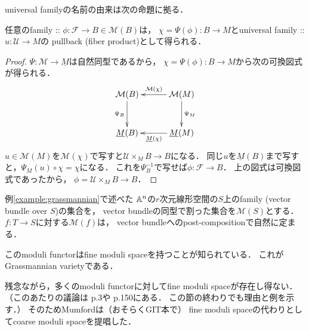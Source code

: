 \documentclass[a4paper]{jsarticle}
\newcommand{\famF}{\mathcal{F}}
\newcommand{\famU}{\mathcal{U}}
\newcommand{\ftor}[1]{\underline{#1}}
\newcommand{\ftorM}{\mathcal{M}}
\begin{document}
    universal familyの名前の由来は次の命題に拠る．
    \begin{Prop}\label{prop:univfamily}
        任意のfamily :: $\phi: \famF \to B \in \ftorM(B)$は，
        $\chi=\Psi(\phi): B \to M$とuniversal family :: $u: \famU \to M$の
        pullback (fiber product)として得られる．
    \end{Prop}
    \begin{proof}
        $\Psi: \ftorM \to \ftor{M}$は自然同型であるから，
        $\chi=\Psi(\phi): B \to M$から次の可換図式が得られる．
        \[\xymatrix@=30pt{
                \ftorM(B) \ar[d]_-{\Psi_B}& \ftorM(M) \ar[l]_-{\ftorM(\chi)}\ar[d]^-{\Psi_M}\\
                \ftor{M}(B) & \ar[l]^-{\ftor{M}(\chi)} \ftor{M}(M) \\
        }\]
        $u \in \ftorM(M)$を$\ftorM(\chi)$で写すと$\famU \times_M B \to B$になる．
        同じ$u$を$\ftor{M}(B)$まで写すと，$\Psi_M(u) \circ \chi=\chi$になる．
        これを$\Psi_B^{-1}$で写せば$\phi:\famF \to B$．
        上の図式は可換図式であったから，
        $\phi=\famU \times_M B \to B$．
    \end{proof}

    \begin{Example}
        例\ref{example:grassmannian}で述べた
        $\mathbb{A}^n$の$r$次元線形空間の$S$上のfamily
        (vector bundle over $S$)の集合を，
        vector bundleの同型で割った集合を$\ftorM(S)$とする．
        $f: T \to S$に対する$\ftorM(f)$は，
        vector bundleへのpost-compositionで自然に定まる．

        このmoduli functorはfine moduli spaceを持つことが知られている．
        これがGrassmannian varietyである．
    \end{Example}

    残念ながら，多くのmoduli functorに対してfine moduli spaceが存在し得ない．
    （このあたりの議論は\cite{HaMo} p.3や\cite{HarDef} p.150にある．
    この節の終わりでも理由と例を示す．）
    そのためMumfordは（おそらくGIT本で）
    fine moduli spaceの代わりとしてcoarse moduli spaceを提唱した．
\end{document}
